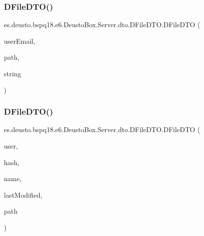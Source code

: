 \subsubsection{\texorpdfstring{D\+File\+D\+T\+O()}{DFileDTO()}\hspace{0.1cm}{\footnotesize\ttfamily [1/2]}}
{\footnotesize\ttfamily es.\+deusto.\+bspq18.\+e6.\+Deusto\+Box.\+Server.\+dto.\+D\+File\+D\+T\+O.\+D\+File\+D\+TO (\begin{DoxyParamCaption}\item[{String}]{user\+Email,  }\item[{String}]{path,  }\item[{String}]{string }\end{DoxyParamCaption})}

\mbox{\label{classes_1_1deusto_1_1bspq18_1_1e6_1_1_deusto_box_1_1_server_1_1dto_1_1_d_file_d_t_o_ad2cb5e2d9eaa852c2fe0703f780418f2}} 
\subsubsection{\texorpdfstring{D\+File\+D\+T\+O()}{DFileDTO()}\hspace{0.1cm}{\footnotesize\ttfamily [2/2]}}
{\footnotesize\ttfamily es.\+deusto.\+bspq18.\+e6.\+Deusto\+Box.\+Server.\+dto.\+D\+File\+D\+T\+O.\+D\+File\+D\+TO (\begin{DoxyParamCaption}\item[{\mbox{\hyperlink{classes_1_1deusto_1_1bspq18_1_1e6_1_1_deusto_box_1_1_server_1_1dto_1_1_d_user_d_t_o}{D\+User\+D\+TO}}}]{user,  }\item[{String}]{hash,  }\item[{String}]{name,  }\item[{String}]{last\+Modified,  }\item[{String}]{path }\end{DoxyParamCaption})}



